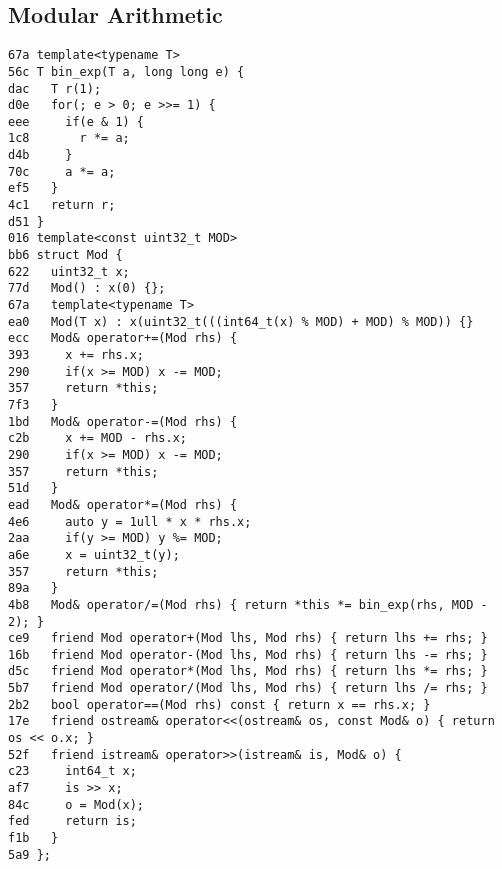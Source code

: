 \documentclass[10pt, a4paper, twoside]{article}
\begin{document}
\subsection{Modular Arithmetic}
\begin{lstlisting}
67a template<typename T>
56c T bin_exp(T a, long long e) {
dac   T r(1);
d0e   for(; e > 0; e >>= 1) {
eee     if(e & 1) {
1c8       r *= a;
d4b     }
70c     a *= a;
ef5   }
4c1   return r;
d51 }
016 template<const uint32_t MOD>
bb6 struct Mod {
622   uint32_t x;
77d   Mod() : x(0) {};
67a   template<typename T>
ea0   Mod(T x) : x(uint32_t(((int64_t(x) % MOD) + MOD) % MOD)) {}
ecc   Mod& operator+=(Mod rhs) {
393     x += rhs.x;
290     if(x >= MOD) x -= MOD;
357     return *this;
7f3   }
1bd   Mod& operator-=(Mod rhs) {
c2b     x += MOD - rhs.x;
290     if(x >= MOD) x -= MOD;
357     return *this;
51d   }
ead   Mod& operator*=(Mod rhs) {
4e6     auto y = 1ull * x * rhs.x;
2aa     if(y >= MOD) y %= MOD;
a6e     x = uint32_t(y);
357     return *this;
89a   }
4b8   Mod& operator/=(Mod rhs) { return *this *= bin_exp(rhs, MOD - 2); }
ce9   friend Mod operator+(Mod lhs, Mod rhs) { return lhs += rhs; }
16b   friend Mod operator-(Mod lhs, Mod rhs) { return lhs -= rhs; }
d5c   friend Mod operator*(Mod lhs, Mod rhs) { return lhs *= rhs; }
5b7   friend Mod operator/(Mod lhs, Mod rhs) { return lhs /= rhs; }
2b2   bool operator==(Mod rhs) const { return x == rhs.x; }
17e   friend ostream& operator<<(ostream& os, const Mod& o) { return os << o.x; }
52f   friend istream& operator>>(istream& is, Mod& o) { 
c23     int64_t x;
af7     is >> x;
84c     o = Mod(x);
fed     return is;
f1b   }
5a9 };
\end{lstlisting}
\end{document}
